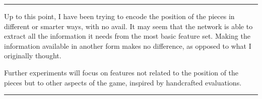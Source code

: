 



\noindent\rule{\textwidth}{1pt}

\vspace{0.2cm}
Up to this point, I have been trying to encode the position of the pieces in different or smarter ways, with no avail. It may seem that the network is able to extract all the information it needs from the most basic  feature set. Making the information available in another form makes no difference, as opposed to what I originally thought.

Further experiments will focus on features not related to the position of the pieces but to other aspects of the game, inspired by handcrafted evaluations.

\noindent\rule{\textwidth}{1pt}








